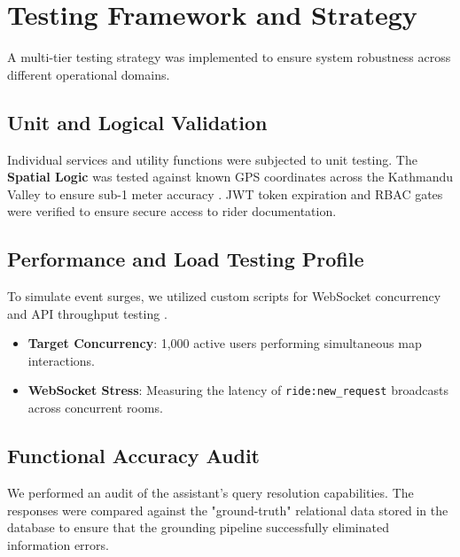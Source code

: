 \section{Testing Framework and Strategy}
A multi-tier testing strategy was implemented to ensure system robustness across different operational domains.

\subsection{Unit and Logical Validation}
Individual services and utility functions were subjected to unit testing. The \textbf{Spatial Logic} was tested against known GPS coordinates across the Kathmandu Valley to ensure sub-1 meter accuracy \cite{postgis}. JWT token expiration and RBAC gates were verified to ensure secure access to rider documentation.

\subsection{Performance and Load Testing Profile}
To simulate event surges, we utilized custom scripts for WebSocket concurrency and API throughput testing \cite{socketio}.
\begin{itemize}
    \item \textbf{Target Concurrency}: 1,000 active users performing simultaneous map interactions.
    \item \textbf{WebSocket Stress}: Measuring the latency of \texttt{ride:new\_request} broadcasts across concurrent rooms.
\end{itemize}

\subsection{Functional Accuracy Audit}
We performed an audit of the assistant's query resolution capabilities. The responses were compared against the "ground-truth" relational data stored in the database to ensure that the grounding pipeline successfully eliminated information errors.


